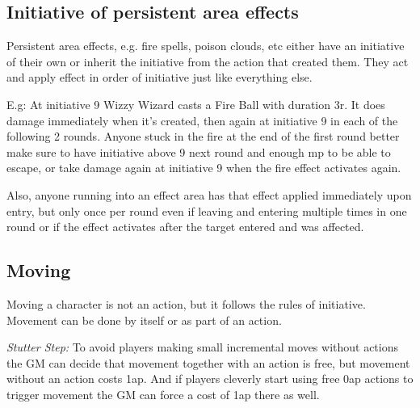 

\subsection*{Initiative of persistent area effects}
Persistent area effects, e.g. fire spells, poison clouds, etc either have an initiative of their own or inherit the initiative from the action that created them. They act and apply effect in order of initiative just like everything else.

E.g: At initiative 9 Wizzy Wizard casts a Fire Ball with duration 3r. It does damage immediately when it's created, then again at initiative 9 in each of the following 2 rounds. Anyone stuck in the fire at the end of the first round better make sure to have initiative above 9 next round and enough mp to be able to escape, or take damage again at initiative 9 when the fire effect activates again.

Also, anyone running into an effect area has that effect applied immediately upon entry, but only once per round even if leaving and entering multiple times in one round or if the effect activates after the target entered and was affected.

















\subsection*{Moving}
Moving a character is not an action, but it follows the rules of initiative. Movement can be done by itself or as part of an action.

\emph{Stutter Step:} To avoid players making small incremental moves without actions the GM can decide that movement together with an action is free, but movement without an action costs 1ap. And if players cleverly start using free 0ap actions to trigger movement the GM can force a cost of 1ap there as well.


